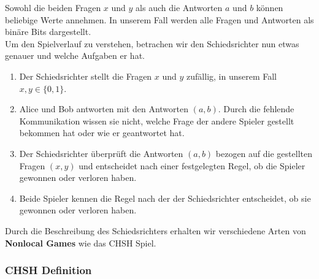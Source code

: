 Sowohl die beiden Fragen $x$ und $y$ als auch die Antworten $a$ und $b$ können beliebige Werte annehmen. In unserem Fall werden alle Fragen und Antworten als binäre Bits dargestellt.\\

Um den Spielverlauf zu verstehen, betrachen wir den Schiedsrichter nun etwas genauer und welche Aufgaben er hat.
\begin{enumerate}
    \item Der Schiedsrichter stellt die Fragen $x$ und $y$ zufällig, in unserem Fall $x, y \in \{0, 1\}$.
    \item Alice und Bob antworten mit den Antworten $(a, b)$. Durch die fehlende Kommunikation wissen sie nicht, welche Frage der andere Spieler gestellt bekommen hat oder wie er geantwortet hat.
    \item Der Schiedsrichter überprüft die Antworten $(a, b)$ bezogen auf die gestellten Fragen $(x, y)$ und entscheidet nach einer festgelegten Regel, ob die Spieler gewonnen oder verloren haben.
    \item Beide Spieler kennen die Regel nach der der Schiedsrichter entscheidet, ob sie gewonnen oder verloren haben.
\end{enumerate}

Durch die Beschreibung des Schiedsrichters erhalten wir verschiedene Arten von \textbf{Nonlocal Games} wie das CHSH Spiel.\\

\subsubsection{CHSH Definition}
\label{subsubsec:chsh_definition}

